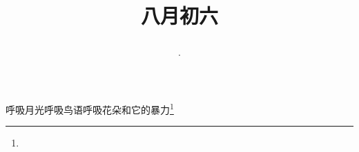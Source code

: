 \title{\date[d=8,m=9,y=2024][year:cn-y,年,month:cn,day:cn,日,·,weekday]·八月初六 }
呼吸月光呼吸鸟语呼吸花朵和它的暴力\footnote{ }

